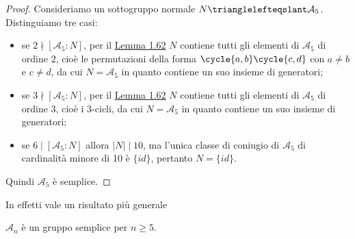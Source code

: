 \documentclass[11pt]{scrartcl}
\begin{document}
\begin{proof}
    Consideriamo un sottogruppo normale $N\trianglelefteqslant \mathcal{A}_5$.
    Distinguiamo tre casi:
    \begin{itemize}
        \item se $2 \nmid [\mathcal{A}_5:N]$, per il \hyperref[lemma1.62]{Lemma 1.62}
        $N$ contiene tutti gli elementi di 
        $\mathcal{A}_5$ di ordine $2$, cioè le permutazioni della forma $\cycle{a, b}\cycle{c, d}$
        con $a\neq b$ e $c \neq d$, da cui $N = \mathcal{A}_5$ in quanto contiene 
        un suo insieme di generatori;
        \item se $3\nmid [\mathcal{A}_5:N]$, per il \hyperref[lemma1.62]{Lemma 1.62}
        $N$ contiene tutti gli elementi di 
        $\mathcal{A}_5$ di ordine 3, cioè i 3-cicli, da cui $N = \mathcal{A}_5$
        in quanto contiene un suo insieme di generatori;
        \item se $6 \mid [\mathcal{A}_5:N]$ allora $|N| \mid 10$, ma l'unica
        classe di coniugio di $\mathcal{A}_5$ di cardinalità minore di 10 è
        $\{id\}$, pertanto $N = \{id\}$.
    \end{itemize}
    Quindi $\mathcal{A}_5$ è semplice.
\end{proof}

In effetti vale un risultato più generale

\begin{proposition}
    $\mathcal{A}_n$ è un gruppo semplice per $n \geq 5$.
\end{proposition}
\end{document}
